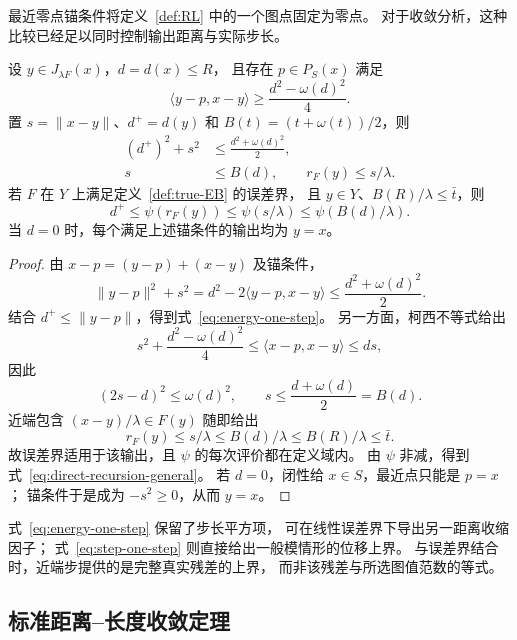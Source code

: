 最近零点锚条件将定义~\ref{def:RL} 中的一个图点固定为零点。
对于收敛分析，这种比较已经足以同时控制输出距离与实际步长。

\begin{lemma}[最近零点锚的一步估计]
\label{lem:one-step}
\label{lem:solution-comparison}
设 $y\in J_{\lambda F}(x)$，$d=d(x)\le R$，
且存在 $p\in P_S(x)$ 满足
\begin{equation}
 \langle y-p,x-y\rangle
 \ge\frac{d^2-\omega(d)^2}{4}.
 \label{eq:one-step-anchor}
\end{equation}
置 $s=\|x-y\|$、$d^+=d(y)$ 和 $B(t)=(t+\omega(t))/2$，则
\begin{align}
 (d^+)^2+s^2&\le\frac{d^2+\omega(d)^2}{2},
 \label{eq:energy-one-step}\\
 s&\le B(d),\qquad r_F(y)\le s/\lambda.
 \label{eq:step-one-step}
\end{align}
若 $F$ 在 $Y$ 上满足定义~\ref{def:true-EB} 的误差界，
且 $y\in Y$、$B(R)/\lambda\le\bar t$，则
\begin{equation}
 d^+\le\psi(r_F(y))\le\psi(s/\lambda)
 \le\psi(B(d)/\lambda).
 \label{eq:direct-recursion-general}
\end{equation}
当 $d=0$ 时，每个满足上述锚条件的输出均为 $y=x$。
\end{lemma}

\begin{proof}
由 $x-p=(y-p)+(x-y)$ 及锚条件，
\[
 \|y-p\|^2+s^2
 =d^2-2\langle y-p,x-y\rangle
 \le\frac{d^2+\omega(d)^2}{2}.
\]
结合 $d^+\le\|y-p\|$，得到式~\eqref{eq:energy-one-step}。
另一方面，柯西不等式给出
\[
 s^2+\frac{d^2-\omega(d)^2}{4}
 \le\langle x-p,x-y\rangle\le ds,
\]
因此
\begin{equation}
 (2s-d)^2\le\omega(d)^2,
 \qquad s\le\frac{d+\omega(d)}2=B(d).
 \label{eq:power-step}
\end{equation}
近端包含 $(x-y)/\lambda\in F(y)$ 随即给出
\[
 r_F(y)\le s/\lambda\le B(d)/\lambda
 \le B(R)/\lambda\le\bar t.
\]
故误差界适用于该输出，且 $\psi$ 的每次评价都在定义域内。
由 $\psi$ 非减，得到式~\eqref{eq:direct-recursion-general}。
若 $d=0$，闭性给 $x\in S$，最近点只能是 $p=x$；
锚条件于是成为 $-s^2\ge0$，从而 $y=x$。
\end{proof}

式~\eqref{eq:energy-one-step} 保留了步长平方项，
可在线性误差界下导出另一距离收缩因子；
式~\eqref{eq:step-one-step} 则直接给出一般模情形的位移上界。
与误差界结合时，近端步提供的是完整真实残差的上界，
而非该残差与所选图值范数的等式。

\subsection{标准距离--长度收敛定理}
\label{subsec:distance-length}

